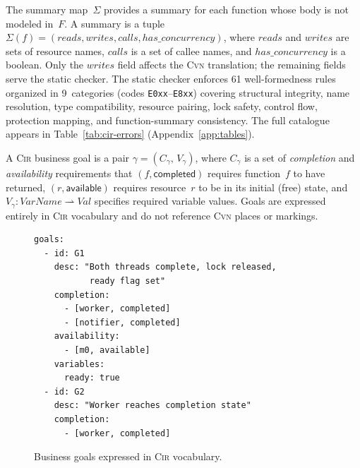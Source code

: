 The summary map~$\Sigma$ provides a summary for each function whose body is not modeled in~$F$. A summary is a tuple $\Sigma(f)=(\mathit{reads},\mathit{writes},\mathit{calls},\mathit{has\_concurrency})$, where $\mathit{reads}$ and $\mathit{writes}$ are sets of resource names, $\mathit{calls}$ is a set of callee names, and $\mathit{has\_concurrency}$ is a boolean. Only the $\mathit{writes}$ field affects the \textsc{Cvn} translation; the remaining fields serve the static checker. The static checker enforces 61 well-formedness rules organized in 9~categories (codes \texttt{E0xx}--\texttt{E8xx}) covering structural integrity, name resolution, type compatibility, resource pairing, lock safety, control flow, protection mapping, and function-summary consistency. The full catalogue appears in Table~\ref{tab:cir-errors} (Appendix~\ref{app:tables}).

\begin{definition}
  \label{def:cir-goal}
  A \textsc{Cir} business goal is a pair $\gamma=(C_\gamma,\,V_\gamma)$, where $C_\gamma$ is a set of \emph{completion} and
  \emph{availability} requirements that $(f,\textsf{completed})$ requires function~$f$ to have returned, $(r,\textsf{available})$ requires resource~$r$ to be in its initial (free) state, and $V_\gamma:\mathit{VarName}\rightharpoonup\mathit{Val}$ specifies required variable values. Goals are expressed entirely in \textsc{Cir} vocabulary and do not
  reference \textsc{Cvn} places or markings.
\end{definition}

\begin{figure}[t]
\begin{lstlisting}[basicstyle=\small\ttfamily,frame=single]
goals:
  - id: G1
    desc: "Both threads complete, lock released,
           ready flag set"
    completion:
      - [worker, completed]
      - [notifier, completed]
    availability:
      - [m0, available]
    variables:
      ready: true
  - id: G2
    desc: "Worker reaches completion state"
    completion:
      - [worker, completed]
\end{lstlisting}
\caption{Business goals expressed in \textsc{Cir} vocabulary.}
\label{fig:goals-example}
\end{figure}

